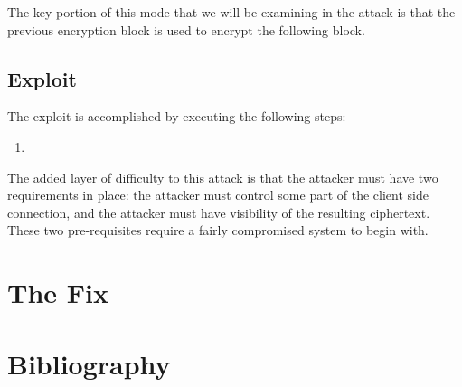 \documentclass[10pt]{article}
\begin{document}
The key portion of this mode that we will be examining in the attack is that
the previous encryption block is used to encrypt the following block.

\subsection*{Exploit}
The exploit is accomplished by executing the following steps:

\begin{enumerate}
\item 
\end{enumerate}

The added layer of difficulty to this attack is that the attacker must have two
requirements in place: the attacker must control some part of the client side
connection, and the attacker must have visibility of the resulting ciphertext.
These two pre-requisites require a fairly compromised system to begin with.\cite{US-CERT}

\section*{The Fix}

\section*{Bibliography}


\end{document}
